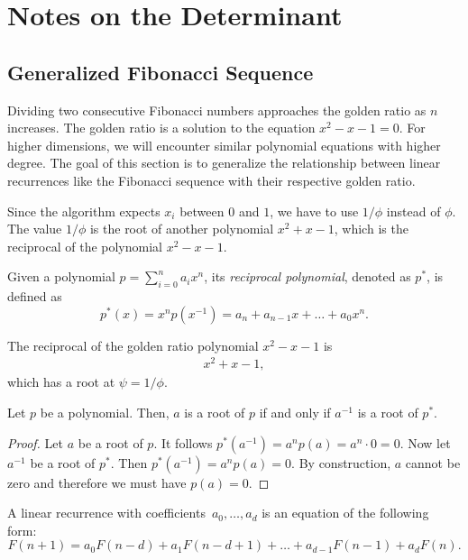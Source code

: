 \chapter{Notes on the Determinant}

\section{Generalized Fibonacci Sequence}

Dividing two consecutive Fibonacci numbers approaches the golden ratio as $n$ increases.
The golden ratio is a solution to the equation $x^2 - x - 1 = 0$.
For higher dimensions, we will encounter similar polynomial equations with higher degree.
The goal of this section is to generalize the relationship between linear
recurrences like the Fibonacci sequence with their respective golden ratio.

Since the algorithm expects $x_i$ between $0$ and $1$, we have to use $1/\phi$ instead of $\phi$.
The value $1/\phi$ is the root of another polynomial $x^2 + x - 1$, which is the reciprocal
of the polynomial $x^2 - x - 1$.

\begin{definition}
  Given a polynomial $p = \sum_{i=0}^n a_i x^n$, its \emph{reciprocal polynomial},
  denoted as $p^*$, is defined as
  \[
    p^*(x) = x^n p(x^{-1}) = a_n + a_{n-1} x + \dots + a_0 x^n.
  \]
\end{definition}

\begin{example}
  The reciprocal of the golden ratio polynomial $x^2 - x - 1$ is
  \begin{align*}
    x^2 + x - 1,
  \end{align*}
  which has a root at $\psi = 1/\phi$.
\end{example}

\begin{lemma}
  Let $p$ be a polynomial. Then, $a$ is a root of $p$ if and only if $a^{-1}$ is a root of $p^*$.
\end{lemma}

\begin{proof}
  Let $a$ be a root of $p$. It follows $p^*(a^{-1}) = a^n p(a) = a^n \cdot 0 = 0$.
  Now let $a^{-1}$ be a root of $p^*$. Then $p^*(a^{-1}) = a^n p(a) = 0$.
  By construction, $a$ cannot be zero and therefore we must have $p(a) = 0$.
\end{proof}

\begin{definition}
  A linear recurrence with coefficients~$a_0, \dots, a_d$ is an equation of the
  following form:
  \[
    F(n + 1) = a_0 F(n - d) + a_1 F(n - d + 1) + \dots + a_{d-1} F(n - 1) + a_d F(n).
  \]
\end{definition}

